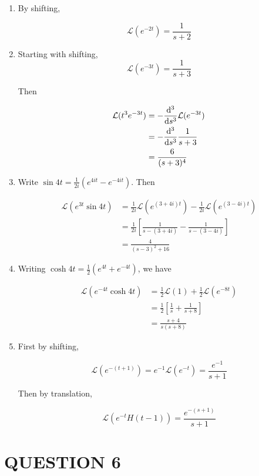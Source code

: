 \documentclass[a4paper]{article}
\begin{document}
\begin{enumerate}
	\item By shifting, 
	
	\[ \mathcal{L}(e^{-2t}) = \frac{1}{s + 2} \]
	
	\item Starting with shifting,
	\[ \mathcal{L}(e^{-3t}) = \frac{1}{s + 3}  \]
	
	Then
	
	\begin{align*}
	\mathcal{L}(t^{3}e^{-3t}) & = - \frac{\mathrm{d}^{3} }{\mathrm{d} s^{3}} \mathcal{L}(e^{-3t})   \\
	& = - \frac{\mathrm{d}^{3} }{\mathrm{d} s^{3}} \frac{1}{s+3}   \\
	& = \frac{6}{(s+3)^{4}}
	\end{align*}
	
	\item Write $ \sin 4t = \frac{1}{2i} (e^{4it} - e^{-4it}) $. Then
	
	\begin{align*}
	\mathcal{L}(e^{3t} \sin 4t)& = \frac{1}{2i} \mathcal{L}(e^{(3 + 4i)t})   - \frac{1}{2i} \mathcal{L}(e^{(3 - 4i)t})   \\
	& = \frac{1}{2i} \left[   \frac{1}{s - (3 + 4i)} - \frac{1}{s - (3 - 4i)} \right] \\
	& = \frac{4}{(s-3)^{2} + 16}
	\end{align*}
	
	\item Writing $ \cosh 4t = \frac{1}{2}(e^{4t} + e^{-4t}) $, we have
	
	\begin{align*}
	\mathcal{L}(e^{-4t} \cosh 4t )& = \frac{1}{2} \mathcal{L}(1) + \frac{1}{2} \mathcal{L}(e^{-8t})   \\
	& = \frac{1}{2} \left[  \frac{1}{s} + \frac{1}{s + 8} \right] \\
	& = \frac{s+4}{s(s+8)}
	\end{align*}
	
	\item First by shifting,
	
	\[ \mathcal{L}(e^{-(t+1)}) = e^{-1} \mathcal{L}(e^{-t}) = \frac{e^{-1}}{s+1} \]
	
	Then by translation,
	
	\[ \mathcal{L}(e^{-t}H(t - 1)) = \frac{e^{-(s+1)}}{s+1} \]
	
	
\end{enumerate}

\section{QUESTION 6}
\end{document}
